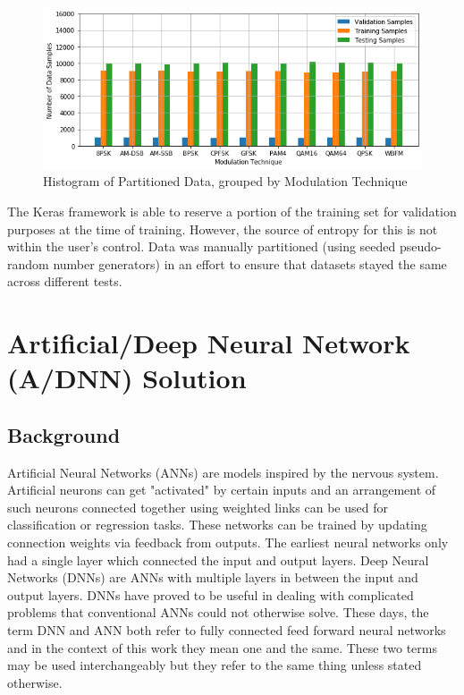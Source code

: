 \documentclass[journal,onecolumn]{IEEEtran}
\begin{document}
\begin{figure}[h]
	\centering
	\includegraphics[scale=0.6]{stratSampleModTech}
	\caption{Histogram of Partitioned Data, grouped by Modulation Technique}
	\label{strat-sample}
\end{figure}

The Keras framework is able to reserve a portion of the training set for validation purposes at the time of training. However, the source of entropy for this is not within the user's control. Data was manually partitioned (using seeded pseudo-random number generators) in an effort to ensure that datasets stayed the same across different tests.

\section{Artificial/Deep Neural Network (A/DNN) Solution}

\subsection{Background}

Artificial Neural Networks (ANNs) are models inspired by the nervous system. Artificial neurons can get "activated" by certain inputs and an arrangement of such neurons connected together using weighted links can be used for classification or regression tasks. These networks can be trained by updating connection weights via feedback from outputs. The earliest neural networks only had a single layer which connected the input and output layers. Deep Neural Networks (DNNs) are ANNs with multiple layers in between the input and output layers. DNNs have proved to be useful in dealing with complicated problems that conventional ANNs could not otherwise solve. These days, the term DNN and ANN both refer to fully connected feed forward neural networks and in the context of this work they mean one and the same. These two terms may be used interchangeably but they refer to the same thing unless stated otherwise.
\end{document}
